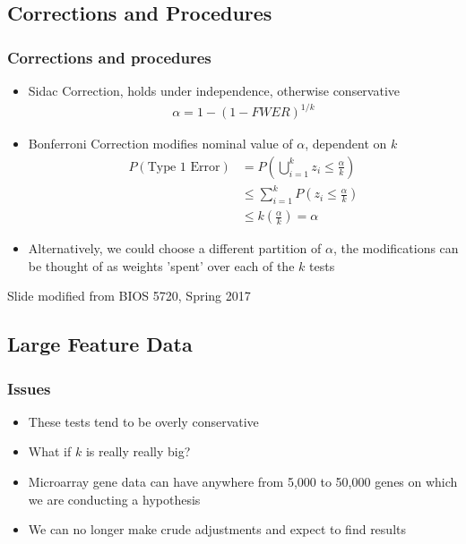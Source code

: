 \documentclass[11pt]{beamer}
\begin{document}
\subsection{Corrections and Procedures}

\begin{frame}
\frametitle{Corrections and procedures}
{\small
\begin{itemize}
\item Sidac Correction, holds under independence, otherwise conservative
\begin{align*}
\alpha = 1 - (1 - FWER)^{1/k}
\end{align*}
\item Bonferroni Correction modifies nominal value of $\alpha$, dependent on $k$
\begin{align*}
P(\text{Type 1 Error}) &= P\left( \bigcup_{i=1}^k z_i \leq \frac{\alpha}{k} \right) \\[6pt]
&\leq \sum_{i=1}^k P \left(  z_i \leq \frac{\alpha}{k} \right) \\[6pt]
&\leq k \left( \frac{\alpha}{k} \right) = \alpha
\end{align*}
\item Alternatively, we could choose a different partition of $\alpha$, the modifications can be thought of as weights 'spent' over each of the $k$ tests
\end{itemize}
\tiny{Slide modified from BIOS 5720, Spring 2017}
}
\end{frame}

\subsection{Large Feature Data}

\begin{frame}
\frametitle{Issues}
{
\begin{itemize}
\item These tests tend to be overly conservative \\
\item What if $k$ is really really big?
\item Microarray gene data can have anywhere from 5,000 to 50,000 genes on which we are conducting a hypothesis
\item We can no longer make crude adjustments and expect to find results
\end{itemize}
}
\end{frame}
\end{document}
